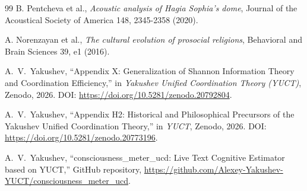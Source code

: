 \documentclass[11pt,a4paper]{article}
\begin{document}
\begin{thebibliography}{99}
		B. Pentcheva et al., \emph{Acoustic analysis of Hagia Sophia's dome}, Journal of the Acoustical Society of America 148, 2345-2358 (2020).
		
		A. Norenzayan et al., \emph{The cultural evolution of prosocial religions}, Behavioral and Brain Sciences 39, e1 (2016).
		
		A.~V.~Yakushev, ``Appendix X: Generalization of Shannon Information Theory and Coordination Efficiency,'' in \emph{Yakushev Unified Coordination Theory (YUCT)}, Zenodo, 2026. DOI: \url{https://doi.org/10.5281/zenodo.20792804}.
		
		A.~V.~Yakushev, ``Appendix H2: Historical and Philosophical Precursors of the Yakushev Unified Coordination Theory,'' in \emph{YUCT}, Zenodo, 2026. DOI: \url{https://doi.org/10.5281/zenodo.20773196}.
		
		A.~V.~Yakushev, ``consciousness\_meter\_ucd: Live Text Cognitive Estimator based on YUCT,'' GitHub repository, \url{https://github.com/Alexey-Yakushev-YUCT/consciousness_meter_ucd}.
		
	\end{thebibliography}
	
\end{document}
